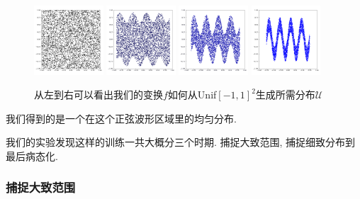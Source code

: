 \documentclass[lang=cn,11pt]{elegantpaper}
\begin{document}
\begin{figure}[hbt]
\centering
  \includegraphics[width=0.23\textwidth]{sin_1_1}  
  \includegraphics[width=0.23\textwidth]{sin_1_2}
  \includegraphics[width=0.23\textwidth]{sin_1_3}
  \includegraphics[width=0.23\textwidth]{sin_1_4}
  \caption{从左到右可以看出我们的变换$f$如何从Unif$[-1,1]^2$生成所需分布$\mathcal U$}
\end{figure}

我们得到的是一个在这个正弦波形区域里的均匀分布.

我们的实验发现这样的训练一共大概分三个时期. 捕捉大致范围, 捕捉细致分布到最后病态化.

\subsubsection{捕捉大致范围}
\end{document}
